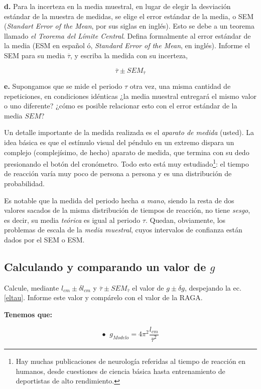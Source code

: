 \documentclass[10pt,a4paper]{article}
\numberwithin{equation}{section}%
\numberwithin{equation}{subsection}
\begin{document}
\noindent \textbf{d.} Para la incerteza en la media muestral, en lugar de elegir la desviación estándar de la muestra de medidas, se elige el error estándar de la media, o SEM (\textit{Standart Error of the Mean}, por sus siglas en inglés). Esto se debe a un teorema llamado \textit{el Teorema del Límite Central}. Defina formalmente al error estándar de la media (ESM en español ó, \textit{Standard Error of the Mean}, en inglés). Informe el SEM para su media $\overline{\tau}$, y escriba la medida con su incerteza,

 $$\overline{\tau} \pm SEM_{\overline{\tau}}$$


\noindent \textbf{e.} Supongamos que se mide el periodo $\tau$ otra vez, una misma cantidad de repeticiones, en condiciones idénticas ¿la media muestral entregará el mismo valor o uno diferente? ¿cómo es posible relacionar esto con el error estándar de la media $SEM$? 

 
Un detalle importante de la medida realizada es el \textit{aparato de medida} (usted). La idea básica es que el estímulo visual del péndulo en un extremo dispara un complejo (complejísimo, de hecho) aparato de medida, que termina con su dedo presionando el botón del cronómetro. Todo esto está muy estudiado\footnote{Hay muchas publicaciones de neurología referidas al tiempo de reacción en humanos, desde cuestiones de ciencia básica hasta entrenamiento de deportistas de alto rendimiento.}: el tiempo de reacción varía muy poco de persona a persona y es una distribución de probabilidad.

Es notable que la medida del periodo hecha \textit{a mano}, siendo la resta de dos valores sacados de la misma distribución de tiempos de reacción, no tiene \textit{sesgo}, es decir, su media \textit{teórica} es igual al periodo $\tau$. Quedan, obviamente, los problemas de escala de la \textit{media muestral}, cuyos intervalos de confianza están dados por el SEM o ESM.


\subsection{Calculando y comparando un valor de $g$}

Calcule, mediante $l_{cm} \pm  \delta  l_{cm}$ y $\overline{\tau} \pm SEM_{\overline{\tau}}$ el valor de $g \pm \delta g$, despejando la ec.\eqref{eltau}. Informe este valor y compárelo con el valor de la RAGA.

\textbf{Tenemos que:}

$$
\bullet \;\;  g_{Modelo} = 4 \pi^2 \frac{l_{cm}}{\bar{\tau}^2}
$$
\end{document}
